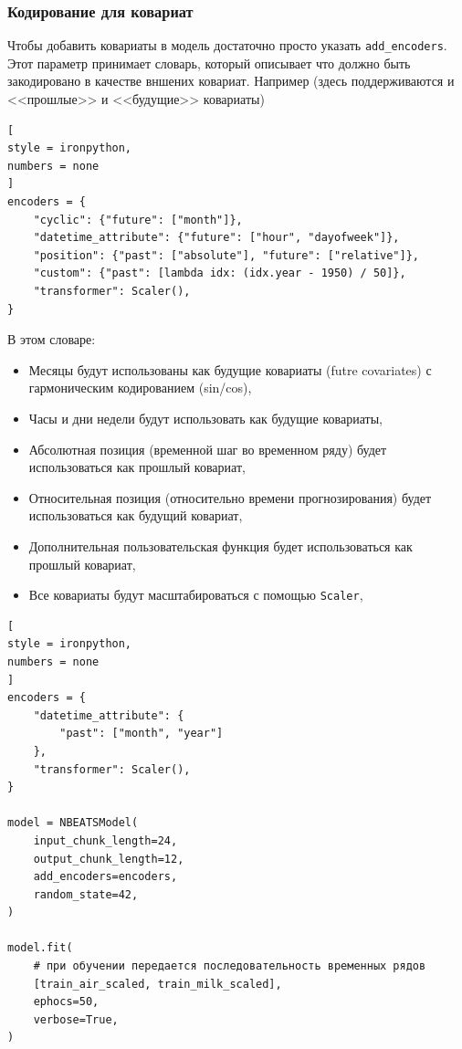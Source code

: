 \documentclass[%
	11pt,
	a4paper,
	utf8,
		]{article}
\begin{document}
\subsubsection{Кодирование для ковариат}

Чтобы добавить ковариаты в модель достаточно просто указать \verb|add_encoders|. Этот параметр принимает словарь, который описывает что должно быть закодировано в качестве вншених ковариат. Например (здесь поддерживаются и <<прошлые>> и <<будущие>> ковариаты)
\begin{lstlisting}[
style = ironpython,
numbers = none
]
encoders = {
	"cyclic": {"future": ["month"]},
	"datetime_attribute": {"future": ["hour", "dayofweek"]},
	"position": {"past": ["absolute"], "future": ["relative"]},
	"custom": {"past": [lambda idx: (idx.year - 1950) / 50]},
	"transformer": Scaler(),
}
\end{lstlisting}

В этом словаре:
\begin{itemize}
	\item Месяцы будут использованы как будущие ковариаты (futre covariates) с гармоническим кодированием (sin/cos),
	
	\item Часы и дни недели будут использовать как будущие ковариаты,
	
	\item Абсолютная позиция (временной шаг во временном ряду) будет использоваться как прошлый ковариат,
	
	\item Относительная позиция (относительно времени прогнозирования) будет использоваться как будущий ковариат,
	
	\item Дополнительная пользовательская функция будет использоваться как прошлый ковариат,
	
	\item Все ковариаты будут масштабироваться с помощью \verb|Scaler|, 
\end{itemize}

\begin{lstlisting}[
style = ironpython,
numbers = none
]
encoders = {
    "datetime_attribute": {
        "past": ["month", "year"]
    },
    "transformer": Scaler(),
}

model = NBEATSModel(
    input_chunk_length=24,
    output_chunk_length=12,
    add_encoders=encoders,
    random_state=42,
)

model.fit(
    # при обучении передается последовательность временных рядов
    [train_air_scaled, train_milk_scaled],
    ephocs=50,
    verbose=True,
)
\end{lstlisting}
\end{document}
